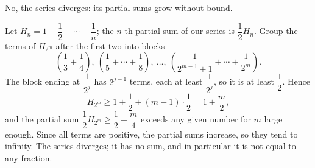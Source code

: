 No, the series diverges: its partial sums grow without bound.

Let $H_n=1+\dfrac12+\cdots+\dfrac1n$; the $n$-th partial sum of our series is $\dfrac12H_n$. Group the terms of $H_{2^m}$ after the first two into blocks
\[\left(\dfrac13+\dfrac14\right),\ \left(\dfrac15+\cdots+\dfrac18\right),\ \dots,\ \left(\dfrac{1}{2^{m-1}+1}+\cdots+\dfrac{1}{2^m}\right).\]
The block ending at $\dfrac1{2^j}$ has $2^{j-1}$ terms, each at least $\dfrac{1}{2^j}$, so it is at least $\dfrac12$. Hence
\[H_{2^m}\ge1+\dfrac12+(m-1)\cdot\dfrac12=1+\dfrac m2,\]
and the partial sum $\dfrac12H_{2^m}\ge\dfrac12+\dfrac m4$ exceeds any given number for $m$ large enough. Since all terms are positive, the partial sums increase, so they tend to infinity. The series $\boxed{\text{diverges}}$; it has no sum, and in particular it is not equal to any fraction.
